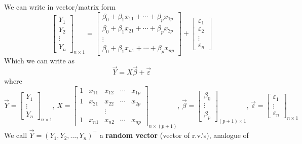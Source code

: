 We can write in vector/matrix form
\[ \begin{bmatrix}
        Y_1    \\
        Y_2    \\
        \vdots \\
        Y_n
    \end{bmatrix}_{n\times 1}=
    \begin{bmatrix}
        \beta_0+\beta_1x_{11}+\cdots+\beta_p x_{1p} \\
        \beta_0+\beta_1x_{21}+\cdots+\beta_p x_{2p} \\
        \vdots                                      \\
        \beta_0+\beta_1x_{n1}+\cdots+\beta_p x_{np}
    \end{bmatrix}+
    \begin{bmatrix}
        \varepsilon_1 \\
        \varepsilon_2 \\
        \vdots        \\
        \varepsilon_n
    \end{bmatrix} \]
Which we can write as
\[ \vec{Y}=X\vec{\beta}+\vec{\varepsilon} \]
where
\[ \vec{Y}=\begin{bmatrix}
        Y_1    \\
        \vdots \\
        Y_{n}
    \end{bmatrix}_{n\times 1},\,
    X=
    \begin{bmatrix}
        1 & x_{11} & x_{12} & \cdots & x_{1p} \\
        1 & x_{21} & x_{22} & \cdots & x_{2p} \\
          &        & \vdots                   \\
        1 & x_{n1} & x_{n2} & \cdots & x_{np}
    \end{bmatrix}_{n\times(p+1)},\,
    \vec{\beta}=
    \begin{bmatrix}
        \beta_0 \\
        \vdots  \\
        \beta_p
    \end{bmatrix}_{(p+1)\times 1},\,
    \vec{\varepsilon}=
    \begin{bmatrix}
        \varepsilon_1 \\
        \vdots        \\
        \varepsilon_n
    \end{bmatrix}_{n\times 1} \]
We call $ \vec{Y}=(Y_1,Y_2,\ldots,Y_{n})^\top $
a \textbf{random vector} (vector of r.v.'s), analogue of
